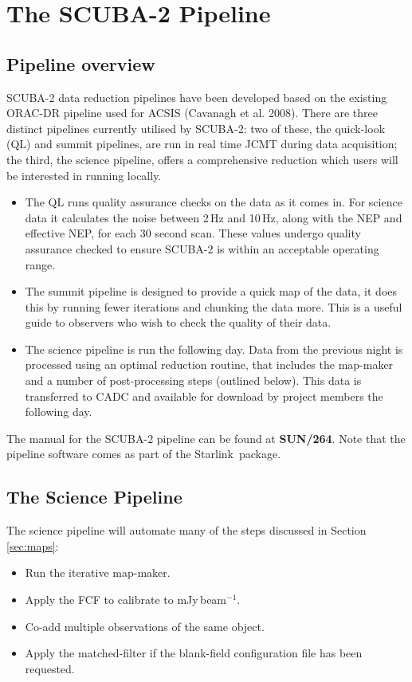 \documentclass[twoside,11pt]{article}
\newcommand{\htmladdnormallink}[2]{#1}
\newcommand{\xref}[3]{#1}
\newcommand{\xlabel}[1]{}
\renewcommand{\_}{\texttt{\symbol{95}}}
\newcommand{\starlink}{\htmladdnormallink{Starlink}{http://starlink.jach.hawaii.edu}}
\newcommand{\pipelinesun}{\xref{\textbf{SUN/264}}{sun264}{}}
\begin{document}
\clearpage
\section{\xlabel{pipeline}The SCUBA-2 Pipeline}
\label{sec:pipe}
\subsection{\xlabel{pl_overview}Pipeline overview}
SCUBA-2 data reduction pipelines have been developed based on the existing ORAC-DR pipeline used for ACSIS (Cavanagh et al. 2008). There are three distinct pipelines currently utilised by SCUBA-2: two of these, the quick-look (QL) and summit pipelines, are run in real time JCMT during data acquisition; the third, the science pipeline, offers a comprehensive reduction which users will be interested in running locally.

\begin{itemize}
\item The QL runs quality assurance checks on the data as it comes in. For science data it calculates the noise between 2\,Hz  and 10\,Hz, along with the NEP and effective NEP, for each 30 second scan. These values undergo quality assurance checked to ensure SCUBA-2 is within an acceptable operating range.
\item The summit pipeline is designed to provide a quick map of the data, it does this by running fewer iterations and chunking the data more. This is a useful guide to observers who wish to check the quality of their data. 
\item The science pipeline is run the following day. Data from the previous night is processed using an optimal reduction routine, that includes the map-maker and a number of post-processing steps (outlined below).  This data is transferred to CADC and available for download by project members the following day.
\end{itemize}

The manual for the SCUBA-2 pipeline can be found at \pipelinesun. Note that the pipeline software comes as part of the \starlink\ package.


\subsection{\xlabel{science_pl}The Science Pipeline}
The science pipeline will automate many of the steps discussed in Section \ref{sec:maps}:
\vspace{-0.3cm}
\begin{itemize}\itemsep-0.3em
\item Run the iterative map-maker.
\item Apply the FCF to calibrate to mJy\,beam$^{-1}$.
\item Co-add multiple observations of the same object.
\item  Apply the matched-filter if the blank-field configuration file has been requested.
\end{itemize}
\end{document}
